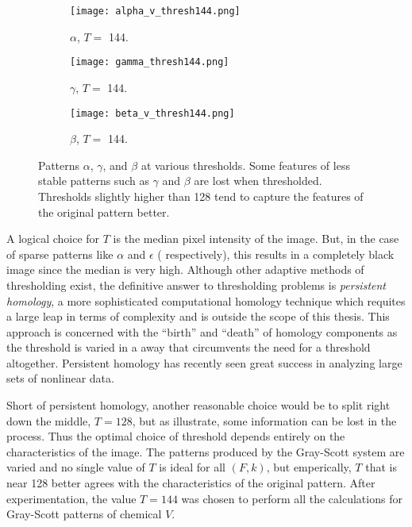 \begin{figure}[p]
        \begin{subfigure}[b]{0.25\textwidth}
                \texttt{[image: alpha\_v\_thresh144.png]}
                \caption{$\alpha$, $T =$ 144.}
                \label{fig:alpha_144}
        \end{subfigure} \quad
         \begin{subfigure}[b]{0.25\textwidth}
                \texttt{[image: gamma\_thresh144.png]}
                \caption{$\gamma$, $T =$ 144.}
                \label{fig:gamma_144}
        \end{subfigure} \quad
         \begin{subfigure}[b]{0.25\textwidth}
                \texttt{[image: beta\_v\_thresh144.png]}
                \caption{$\beta$, $T =$ 144.}
                \label{fig:beta_144}
        \end{subfigure} \hfill
        \caption{Patterns $\alpha$, $\gamma$, and $\beta$ at various thresholds. Some features of less stable patterns such as $\gamma$ and $\beta$ are lost when thresholded. Thresholds slightly higher than 128 tend to capture the features of the original pattern better.} \label{fig:thresholds}
\end{figure}

A logical choice for $T$ is the median pixel intensity of the image. But, in the case of sparse patterns like $\alpha$ and $\epsilon$ ( respectively), this results in a completely black image since the median is very high. Although other adaptive methods of thresholding exist, the definitive answer to thresholding problems is \emph{persistent homology}, a more sophisticated computational homology technique which requites a large leap in terms of complexity and is outside the scope of this thesis. This approach is concerned with the ``birth'' and ``death'' of homology components as the threshold is varied in a away that circumvents the need for a threshold altogether. Persistent homology has recently seen great success in analyzing large sets of nonlinear data.

Short of persistent homology, another reasonable choice would be to split right down the middle, $T = 128$, but as  illustrate, some information can be lost in the process. Thus the optimal choice of threshold depends entirely on the characteristics of the image. The patterns produced by the Gray-Scott system are varied and no single value of $T$ is ideal for all $(F, k)$, but emperically, $T$ that is near 128 better agrees with the characteristics of the original pattern. After experimentation, the value $T = 144$ was chosen to perform all the calculations for Gray-Scott patterns of chemical $V$.

